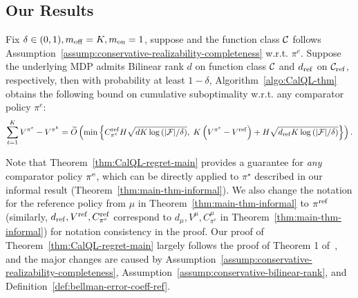 \subsection{Our Results}
\label{appdendix:derivation-CalQL}
\begin{theorem}
\label{thm:CalQL-regret-main}
    Fix $\delta\in(0,1),m_\mathrm{off}=K,m_\mathrm{on}=1$, suppose and the function class $\mathcal C$ follows Assumption~\ref{assump:conservative-realizability-completeness} w.r.t. $\pi^e$. Suppose the underlying MDP admits Bilinear rank $d$ on function class $\mathcal C$ and $d_\mathrm{ref}$ on $\mathcal C_\mathrm{ref}$, respectively, then with probability at least $1-\delta$, Algorithm~\ref{algo:CalQL-thm} obtains the following bound on cumulative suboptimality w.r.t. any comparator policy $\pi^e$:{\small
    \begin{equation}
        \begin{split}
        \sum_{t=1}^KV^{\pi^e}-V^{\pi^k} =\widetilde{O}\left( \min\left\{ C_{\pi^e}^\mathrm{ref}H\sqrt{dK\log\left( |\mathcal F|/\delta \right)},\;K\left( V^{\pi^e}-V^\mathrm{ref} \right)+H\sqrt{d_\mathrm{ref}K\log\left( |\mathcal F|/\delta \right)} \right\} \right).
        \end{split}
    \end{equation}
    }
\end{theorem}
\noindent Note that Theorem~\ref{thm:CalQL-regret-main} provides a guarantee for {\em any} comparator policy $\pi^{\mathrm{e}}$, which can be directly applied to $\pi^\star$ described in our informal result (Theorem~\ref{thm:main-thm-informal}). We also change the notation
for the reference policy from $\mu$ in Theorem~\ref{thm:main-thm-informal} to $\pi^\mathrm{ref}$ (similarly, $d_\mathrm{ref},V^\mathrm{ref},C_{\pi^e}^\mathrm{ref}$ correspond to $d_\mu,V^\mu,C_{\pi^e}^\mu$ in Theorem~\ref{thm:main-thm-informal}) for notation consistency in the proof. Our proof of Theorem~\ref{thm:CalQL-regret-main} largely follows the proof of Theorem 1 of~\citep{song2023hybrid}, and the major changes are caused by Assumption~\ref{assump:conservative-realizability-completeness}, Assumption~\ref{assump:conservative-bilinear-rank}, and Definition~\ref{def:bellman-error-coeff-ref}.
